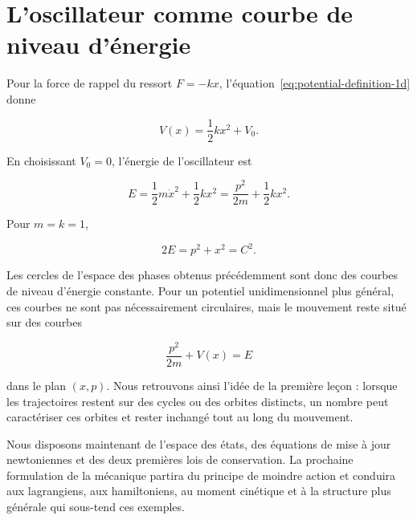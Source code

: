 \section{L’oscillateur comme courbe de niveau d’énergie}\enlargethispage{3\baselineskip}

Pour la force de rappel du ressort \(F=-kx\), l’équation~\eqref{eq:potential-definition-1d} donne

\begin{equation}
  V(x)=\frac12kx^2+V_0.
  \label{eq:spring-potential}
\end{equation}

En choisissant \(V_0=0\), l’énergie de l’oscillateur est

\begin{equation}
  E=\frac12m\dot x^2+\frac12kx^2
   =\frac{p^2}{2m}+\frac12kx^2.
  \label{eq:oscillator-energy}
\end{equation}

Pour \(m=k=1\),

\begin{equation}
  2E=p^2+x^2=C^2.
  \label{eq:oscillator-energy-circle}
\end{equation}

Les cercles de l’espace des phases obtenus précédemment sont donc des courbes de niveau d’énergie constante. Pour un potentiel unidimensionnel plus général, ces courbes ne sont pas nécessairement circulaires, mais le mouvement reste situé sur des courbes

\begin{equation}
  \frac{p^2}{2m}+V(x)=E
  \label{eq:general-energy-contour}
\end{equation}

dans le plan \((x,p)\). Nous retrouvons ainsi l’idée de la première leçon : lorsque les trajectoires restent sur des cycles ou des orbites distincts, un nombre peut caractériser ces orbites et rester inchangé tout au long du mouvement.

Nous disposons maintenant de l’espace des états, des équations de mise à jour newtoniennes et des deux premières lois de conservation. La prochaine formulation de la mécanique partira du principe de moindre action et conduira aux lagrangiens, aux hamiltoniens, au moment cinétique et à la structure plus générale qui sous-tend ces exemples.

\begin{classroomqa}\end{classroomqa}